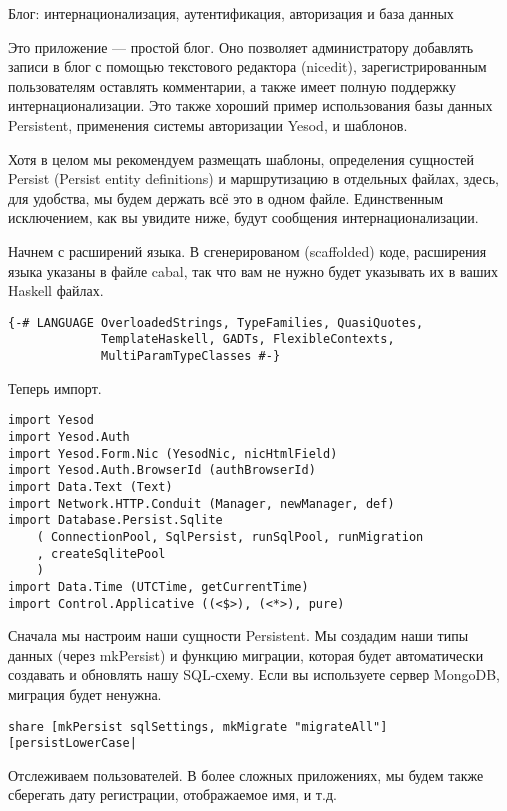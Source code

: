 Блог: интернационализация, аутентификация, авторизация и база данных

Это приложение --- простой блог. Оно позволяет администратору добавлять записи в блог с помощью текстового редактора (nicedit), зарегистрированным пользователям оставлять комментарии, а также имеет полную поддержку интернационализации. Это также хороший пример использования базы данных Persistent, применения системы авторизации Yesod, и шаблонов.

Хотя в целом мы рекомендуем размещать шаблоны, определения сущностей Persist (Persist entity definitions) и маршрутизацию в отдельных файлах, здесь, для удобства, мы будем держать всё это в одном файле. Единственным исключением, как вы увидите ниже, будут сообщения интернационализации.

Начнем с расширений языка. В сгенерированом (scaffolded) коде, расширения языка указаны в файле cabal, так что вам не нужно будет указывать их в ваших Haskell файлах.
 
\begin{lstlisting}
{-# LANGUAGE OverloadedStrings, TypeFamilies, QuasiQuotes,
             TemplateHaskell, GADTs, FlexibleContexts,
             MultiParamTypeClasses #-}
\end{lstlisting}
 
Теперь импорт. 

\begin{lstlisting} 
import Yesod
import Yesod.Auth
import Yesod.Form.Nic (YesodNic, nicHtmlField)
import Yesod.Auth.BrowserId (authBrowserId)
import Data.Text (Text)
import Network.HTTP.Conduit (Manager, newManager, def)
import Database.Persist.Sqlite
    ( ConnectionPool, SqlPersist, runSqlPool, runMigration
    , createSqlitePool
    )
import Data.Time (UTCTime, getCurrentTime)
import Control.Applicative ((<$>), (<*>), pure)
\end{lstlisting}

Сначала мы настроим наши сущности Persistent. Мы создадим наши типы данных (через mkPersist) и функцию миграции, которая будет автоматически создавать и обновлять нашу SQL-схему. Если вы используете сервер MongoDB, миграция будет ненужна.

\begin{lstlisting}
share [mkPersist sqlSettings, mkMigrate "migrateAll"] [persistLowerCase|
\end{lstlisting}
 
Отслеживаем пользователей. В более сложных приложениях, мы будем также сберегать дату регистрации, отображаемое имя, и т.д.
 
